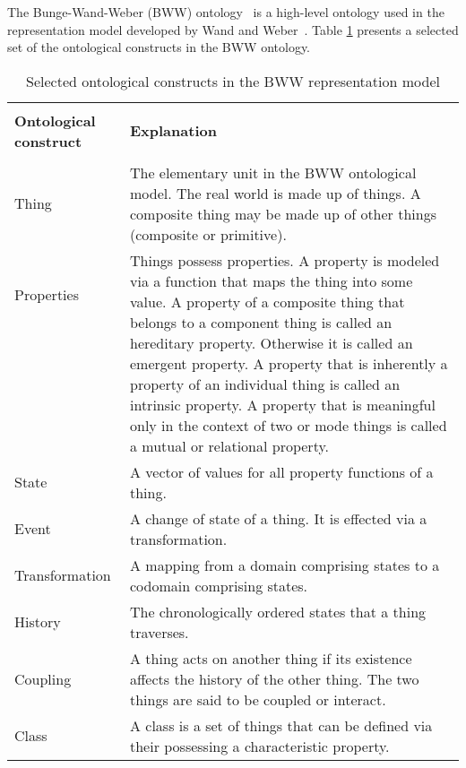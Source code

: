 \documentclass[parskip=full]{uvamscse}
\begin{document}
The Bunge-Wand-Weber (BWW) ontology~\cite{wand1990ontological} is a high-level ontology used in the representation model developed by Wand and Weber~\cite{wand1995deep}. Table \ref{tab:bwwmodel} presents a selected set of the ontological constructs in the BWW ontology.

\begin{center}
\begin{longtable}{ | p{11em} | p{30em} | } 
\caption{Selected ontological constructs in the BWW representation model}
\label{tab:bwwmodel}\\
\hline
 &  \\
\textbf{Ontological construct} & \textbf{Explanation} \\
 &  \\
\hline
Thing & The elementary unit in the BWW ontological model. The real world is made up of things. A composite thing may be made up of other things (composite or primitive). \\ 
\hline
Properties & \multirow{7}{30em}{Things possess properties. A property is modeled via a function that maps the thing into some value. A property of a composite thing that belongs to a component thing is called an hereditary property. Otherwise it is called an emergent property. A property that is inherently a property of an individual thing is called an intrinsic property. A property that is meaningful only in the context of two or mode things is called a mutual or relational property.} \\ 
 &  \\ 
 &  \\
 &  \\
 &  \\
 &  \\
 &  \\
 \hline
 State & A vector of values for all property functions of a thing. \\
 \hline
 Event & A change of state of a thing. It is effected via a transformation. \\
 \hline
 Transformation & A mapping from a domain comprising states to a codomain comprising states. \\
 \hline
 History & The chronologically ordered states that a thing traverses. \\
 \hline
 Coupling & A thing acts on another thing if its existence affects the history of the other thing. The two things are said to be coupled or interact. \\
 \hline
 Class & A class is a set of things that can be defined via their possessing a characteristic property. \\ 

\end{longtable}
\end{center}
\end{document}
